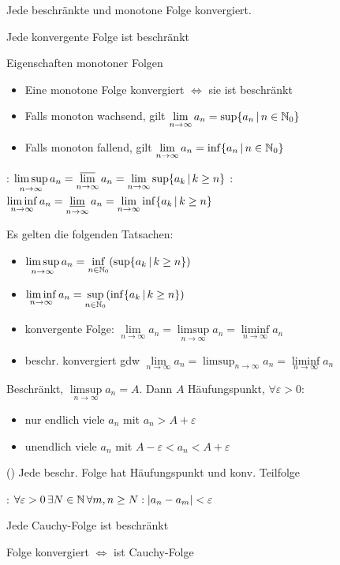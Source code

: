 \Satz Jede beschränkte und monotone Folge konvergiert.

\Satz Jede konvergente Folge ist beschränkt

\Satz Eigenschaften monotoner Folgen
\vspace{-0.6em}
\begin{itemize}
    \item Eine monotone Folge konvergiert $\iff$ sie ist beschränkt
    \item Falls monoton wachsend, gilt $\lim\limits_{n\to\infty}a_n = \sup\{a_n \, | \, n \in \mathbb{N}_0\}$
    \item Falls monoton fallend, gilt $\lim\limits_{n\to\infty}a_n = \inf\{a_n \, | \, n \in \mathbb{N}_0\}$
\end{itemize}

\Def {}: $\limsup\limits_{n\to\infty} a_n = \varlimsup\limits_{n\to\infty} a_n = \lim\limits_{n\to\infty} \sup\{a_k \, | \, k\ge n\}$
: $\liminf\limits_{n\to\infty} a_n = \varliminf\limits_{n \to \infty} a_n = \lim\limits_{n\to\infty} \inf\{a_k \, | \, k\ge n\}$

\Satz Es gelten die folgenden Tatsachen:
\vspace{-0.6em}
\begin{itemize}
    \item $\limsup\limits_{n\to\infty} a_n = \inf\limits_{n\in\mathbb{N}_0}(\sup\{a_k \, | \, k\ge n\})$
    \item $\liminf\limits_{n\to\infty} a_n = \sup\limits_{n\in\mathbb{N}_0}(\inf\{a_k \, | \, k\ge n\})$
    \item konvergente Folge: $\lim\limits_{n\to\infty} a_n = \limsup\limits_{n\to\infty} a_n = \liminf\limits_{n\to\infty} a_n$
    \item beschr. konvergiert gdw $\lim\limits_{n\to\infty}a_n = \limsup_{n\to\infty} a_n = \liminf\limits_{n\to\infty} a_n$
\end{itemize}

\Satz Beschränkt, $\limsup\limits_{n\to\infty}a_n = A$. Dann $A$ Häufungspunkt,  $\forall\varepsilon > 0$:
\vspace{-0.6em}
\begin{itemize}
    \item nur endlich viele $a_n$ mit $a_n > A + \varepsilon$
    \item unendlich viele $a_n$ mit $A - \varepsilon < a_n < A + \varepsilon$
\end{itemize}

\Kor () Jede beschr. Folge hat Häufungspunkt und konv. Teilfolge

\Def {}: $\forall \varepsilon > 0 \, \exists N \in \mathbb{N} \, \forall m, n\ge N : |a_n - a_m| < \varepsilon$

\Satz Jede Cauchy-Folge ist beschränkt

\Satz Folge konvergiert $\iff$ ist Cauchy-Folge
